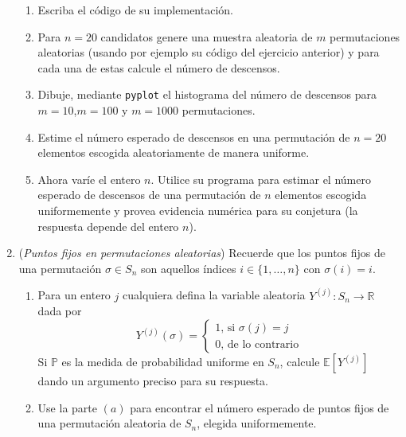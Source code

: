 \documentclass[12pt, a4paper]{article}
\newcommand{\RR}{\mathbb{R}}
\newcommand{\EE}{\mathbb{E}}
\begin{document}
\begin{enumerate}
\begin{enumerate}
\item Escriba el código de su implementación.
\item Para $n=20$ candidatos genere una muestra aleatoria de $m$ permutaciones aleatorias (usando por ejemplo su código del ejercicio anterior) y para cada una de estas calcule el número de descensos.
\item Dibuje, mediante \verb!pyplot! el histograma del número de descensos para $m=10$,$m=100$ y $m=1000$ permutaciones.
\item Estime el número esperado de descensos en una permutación de $n=20$ elementos escogida aleatoriamente de manera uniforme.
\item Ahora varíe el entero $n$. Utilice su programa para estimar el número esperado de descensos de una permutación de $n$ elementos escogida uniformemente y provea evidencia numérica para su conjetura (la respuesta depende del entero $n$).
\end{enumerate}



\item ({\it Puntos fijos en permutaciones aleatorias}) Recuerde que los puntos fijos de una permutación $\sigma\in S_n$ son aquellos índices $i\in \{1,\dots, n\}$ con $\sigma(i)=i$.
\begin{enumerate}
\item Para un entero $j$ cualquiera defina la variable aleatoria $Y^{(j)}:S_n\rightarrow \RR$ dada por
\[Y^{(j)}(\sigma)=
\begin{cases}
1\text{, si $\sigma(j)=j$}\\
0\text{, de lo contrario}
\end{cases}
\]
Si $\mathbb{P}$ es la medida de probabilidad uniforme en $S_n$, calcule $\EE[Y^{(j)}]$ dando un argumento preciso para su respuesta.
\item Use la parte $(a)$ para encontrar el número esperado de puntos fijos de una permutación aleatoria de $S_n$, elegida uniformemente.
\end{enumerate}



\end{enumerate}
\end{document}
